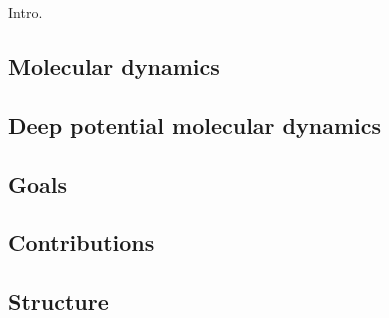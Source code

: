 Intro.

\subsection{Molecular dynamics}

\subsection{Deep potential molecular dynamics}

\subsection{Goals}

\subsection{Contributions}

\subsection{Structure}
